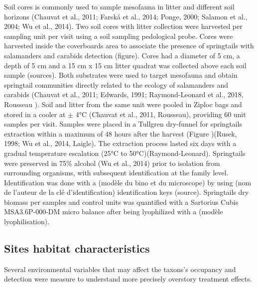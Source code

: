 Soil cores is commonly used to sample mesofauna in litter and different soil horizons (Chauvat et al., 2011; Farská et al., 2014; Ponge, 2000; Salamon et al., 2004; Wu et al., 2014). 
Two soil cores with litter collection were harvested per sampling unit per visit using a soil sampling pedological probe. 
Cores were harvested inside the coverboards area to associate the presence of springtails with salamanders and carabids detection (figure). 
Cores had a diameter of 5 cm, a depth of 5 cm and a 15 cm x 15 cm litter quadrat was collected above each soil sample (sources).
Both substrates were used to target mesofauna and obtain springtail communities directly related to the ecology of salamanders and carabids (Chauvat et al., 2011; Edwards, 1991; Raymond-Leonard et al., 2018, Rousseau ).
Soil and litter from the same unit were pooled in Ziploc bags and stored in a cooler at $\pm$ 4°C (Chauvat et al., 2011, Rousseau), providing 60 unit samples per visit.
Samples were placed in a Tullgren dry-funnel for springtails extraction within a maximum of 48 hours after the harvest (Figure )(Rusek, 1998; Wu et al., 2014, Laigle). 
The extraction process lasted six days with a gradual temperature escalation (25°C to 50°C)(Raymond-Leonard).
Springtails were preserved in 75\% alcohol (Wu et al., 2014) prior to isolation from surrounding organisms, with subsequent identification at the family level.
Identification was done with a (modèle du bino et du microscope) by using (nom de l'auteur de la clé d'identification) identification keys (source).
Springtails dry biomass per samples and control units was quantified with a Sartorius Cubis MSA3.6P-000-DM micro balance after being lyophilized with a (modèle lyophilisation).



\subsection*{Sites habitat characteristics}
\label{subsec:habitat}

Several environmental variables that may affect the taxons's occupancy and detection were measure to understand more precisely overstory treatment effects.

